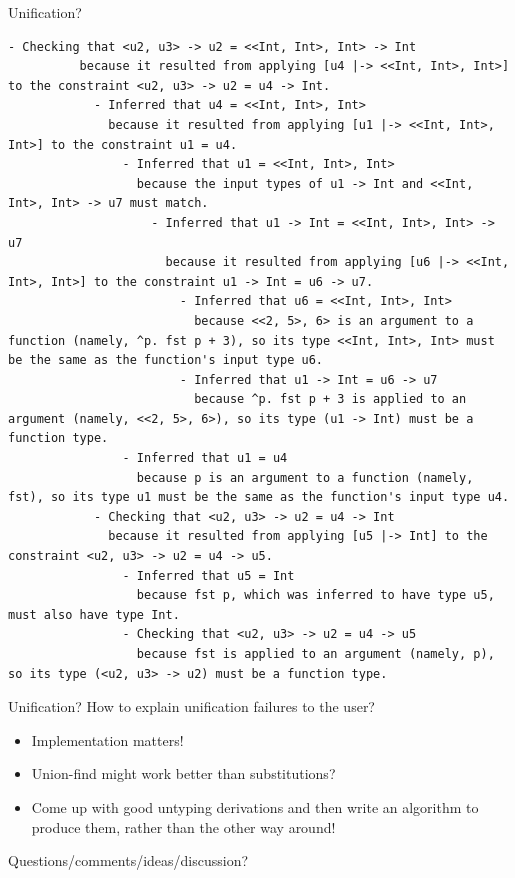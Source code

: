\documentclass[xcolor=svgnames,12pt,aspectratio=169]{beamer}
\newenvironment{xframe}[1][]
  {\begin{frame}[fragile,environment=xframe,#1]}
  {\end{frame}}
\begin{document}
\begin{xframe}{Unification?}
\begin{Verbatim}[fontsize=\TINY]
        - Checking that <u2, u3> -> u2 = <<Int, Int>, Int> -> Int
          because it resulted from applying [u4 |-> <<Int, Int>, Int>] to the constraint <u2, u3> -> u2 = u4 -> Int.
            - Inferred that u4 = <<Int, Int>, Int>
              because it resulted from applying [u1 |-> <<Int, Int>, Int>] to the constraint u1 = u4.
                - Inferred that u1 = <<Int, Int>, Int>
                  because the input types of u1 -> Int and <<Int, Int>, Int> -> u7 must match.
                    - Inferred that u1 -> Int = <<Int, Int>, Int> -> u7
                      because it resulted from applying [u6 |-> <<Int, Int>, Int>] to the constraint u1 -> Int = u6 -> u7.
                        - Inferred that u6 = <<Int, Int>, Int>
                          because <<2, 5>, 6> is an argument to a function (namely, ^p. fst p + 3), so its type <<Int, Int>, Int> must be the same as the function's input type u6.
                        - Inferred that u1 -> Int = u6 -> u7
                          because ^p. fst p + 3 is applied to an argument (namely, <<2, 5>, 6>), so its type (u1 -> Int) must be a function type.
                - Inferred that u1 = u4
                  because p is an argument to a function (namely, fst), so its type u1 must be the same as the function's input type u4.
            - Checking that <u2, u3> -> u2 = u4 -> Int
              because it resulted from applying [u5 |-> Int] to the constraint <u2, u3> -> u2 = u4 -> u5.
                - Inferred that u5 = Int
                  because fst p, which was inferred to have type u5, must also have type Int.
                - Checking that <u2, u3> -> u2 = u4 -> u5
                  because fst is applied to an argument (namely, p), so its type (<u2, u3> -> u2) must be a function type.
\end{Verbatim}
\end{xframe}

\begin{xframe}{Unification?}
  How to explain unification failures to the user?
  \begin{itemize}
  \item<2-> Implementation matters!
  \item<3-> Union-find might work better than substitutions?
  \item<4> Come up with good untyping derivations and then write an
    algorithm to produce them, rather than the other way around!
  \end{itemize}
\end{xframe}

\begin{xframe}{}
  \begin{center}
    Questions/comments/ideas/discussion?
  \end{center}
\end{xframe}
\end{document}
